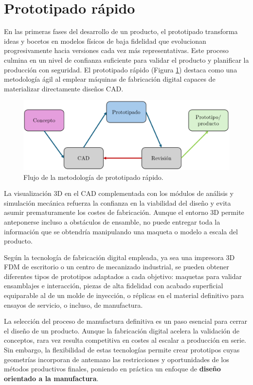 \section{Prototipado rápido}

En las primeras fases del desarrollo de un producto, el prototipado transforma ideas y bocetos en modelos físicos de baja fidelidad que evolucionan progresivamente hacia versiones cada vez más representativas. Este proceso culmina en un nivel de confianza suficiente para validar el producto y planificar la producción con seguridad. El prototipado rápido (Figura \ref{propro}) destaca como una metodología ágil al emplear máquinas de fabricación digital capaces de materializar directamente diseños CAD.

\begin{figure}[h!]
    \centering
    \includegraphics[width=1.0\linewidth]{imgs/prototip.png}
    \caption{Flujo de la metodología de prototipado rápido.}
    \label{propro}
\end{figure}

La visualización 3D en el CAD complementada con los módulos de análisis y simulación mecánica refuerza la confianza en la viabilidad del diseño y evita asumir prematuramente los costes de fabricación. Aunque el entorno 3D permite anteponerse incluso a obstáculos de ensamble, no puede entregar toda la información que se obtendría manipulando una maqueta o modelo a escala del producto.

Según la tecnología de fabricación digital empleada, ya sea una impresora 3D FDM de escritorio o un centro de mecanizado industrial, se pueden obtener diferentes tipos de prototipos adaptados a cada objetivo: maquetas para validar ensamblajes e interacción, piezas de alta fidelidad con acabado superficial equiparable al de un molde de inyección, o réplicas en el material definitivo para ensayos de servicio, o incluso, de manufactura.

La selección del proceso de manufactura definitiva es un paso esencial para cerrar el diseño de un producto. Aunque la fabricación digital acelera la validación de conceptos, rara vez resulta competitiva en costes al escalar a producción en serie. Sin embargo, la flexibilidad de estas tecnologías permite crear prototipos cuyas geometrías incorporan de antemano las restricciones y oportunidades de los métodos productivos finales, poniendo en práctica un enfoque de \textbf{diseño orientado a la manufactura}.